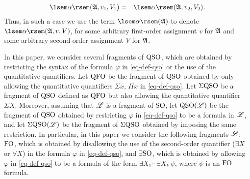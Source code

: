 \begin{eqnarray*}
\sem{\alpha}(\A, v_1, V_1) & = & \sem{\alpha}(\A, v_2, V_2).
\end{eqnarray*}
Thus, in such a case we use the term $\sem{\alpha}(\A)$ to denote $\sem{\alpha}(\A, v, V)$, for some arbitrary first-order assignment $v$ for $\mathfrak{A}$ and some arbitrary second-order assignment $V$ for $\mathfrak{A}$. 

In this paper, we consider several fragments of ${\rm QSO}$, which are obtained by restricting the syntax of the formula $\varphi$ in \eqref{eq-def-qso} or the use of the quantitative quantifiers. Let ${\rm QFO}$ be the fragment of ${\rm QSO}$ obtained by only allowing the quantitative quantifiers $\Sigma x$, $\Pi x$ in \eqref{eq-def-qso}. Let $\Sigma{\rm QSO}$ be a fragment of ${\rm QSO}$ defined as ${\rm QFO}$ but also allowing the quantitative quantifier $\Sigma X$. Moreover, assuming that $\mathscr{L}$ is a fragment of ${\rm SO}$, let ${\rm QSO}(\mathscr{L})$ be the fragment of ${\rm QSO}$ obtained by restricting $\varphi$ in \eqref{eq-def-qso} to be a formula in $\mathscr{L}$, and let $\Sigma{\rm QSO}(\mathscr{L})$ be the fragment of $\Sigma{\rm QSO}$ obtained by imposing the same restriction. In particular, in this paper we consider the following fragments $\mathscr{L}$: ${\rm FO}$, which is obtained by disallowing the use of the second-order quantifier ($\exists X$ or $\forall X$) in the formula $\varphi$ in \eqref{eq-def-qso}, and $\exists{\rm SO}$, which is obtained by allowing $\varphi$ in \eqref{eq-def-qso} to be a formula of the form $\exists X_1 \cdots \exists X_k \, \psi$, where $\psi$ is an ${\rm FO}$-formula. 


